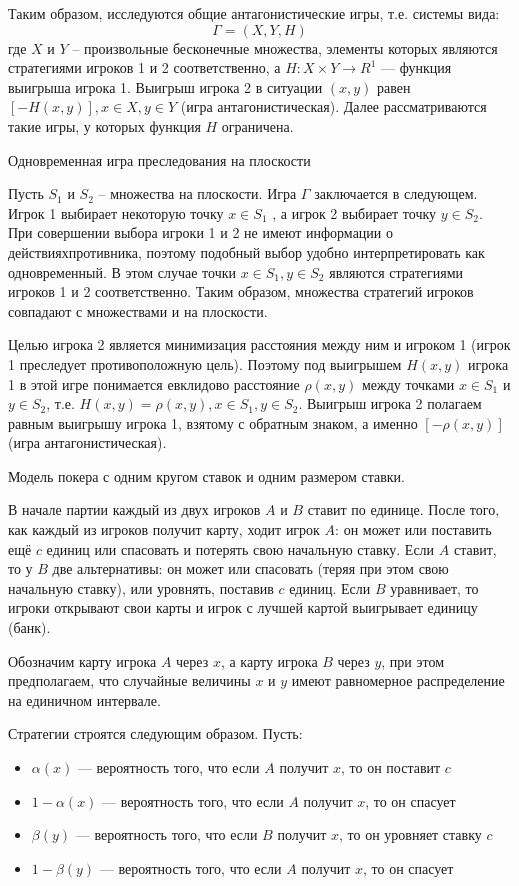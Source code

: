 \documentclass[12pt,a4paper]{article}
\begin{document}
Таким образом, исследуются общие антагонистические игры, т.е. системы
вида:
\[
  \Gamma = (X, Y, H)
\]
где $X$ и $Y$ – произвольные бесконечные множества, элементы которых
являются стратегиями игроков 1 и 2 соответственно,
а $H:X \times Y \rightarrow R^1$ --- функция выигрыша игрока 1.
Выигрыш игрока 2 в ситуации $(x, y)$ равен $[-H(x,y)], x \in X, y \in Y$ (игра антагонистическая).
Далее рассматриваются такие игры, у которых функция $H$ ограничена.

\vspace{.5cm}
Одновременная игра преследования на плоскости

Пусть $S_1$ и $S_2$ – множества на плоскости. Игра $\Gamma$ заключается в следующем.
Игрок 1 выбирает некоторую точку $x \in S_1$ , а игрок 2 выбирает точку $y \in S_2$.
При совершении выбора игроки 1 и 2 не имеют информации о действияхпротивника,
поэтому подобный выбор удобно интерпретировать как одновременный.
В этом случае точки $x \in S_1, y \in S_2$ являются стратегиями игроков
1 и 2 соответственно. Таким образом, множества стратегий игроков совпадают с
множествами и на плоскости.

Целью игрока 2 является минимизация расстояния между ним и игроком 1
(игрок 1 преследует противоположную цель). Поэтому под выигрышем $H(x,y)$
игрока 1 в этой игре понимается евклидово расстояние $\rho(x,y)$ между точками
$x \in S_1$ и $y \in S_2$, т.е. $H(x, y) = \rho(x, y), x \in S_1, y \in S_2$.
Выигрыш игрока 2 полагаем равным выигрышу игрока 1, взятому с обратным знаком,
а именно $[-\rho(x,y)]$ (игра антагонистическая).

\vspace{.5cm}
Модель покера с одним кругом ставок и одним размером ставки.

В начале партии каждый из двух игроков $A$ и $B$ ставит по единице.
После того, как каждый из игроков получит карту, ходит игрок $A$:
он может или поставить ещё $c$ единиц или спасовать и потерять свою начальную ставку.
Если $A$ ставит, то у $B$ две альтернативы: он может или спасовать (теряя при этом
свою начальную ставку), или уровнять, поставив $c$ единиц. Если $B$ уравнивает,
то игроки открывают свои карты и игрок с лучшей картой выигрывает единицу
(банк).

Обозначим карту игрока $A$ через $x$, а карту игрока $B$ через $y$,
при этом предполагаем, что случайные величины $x$ и $y$ имеют
равномерное распределение на единичном интервале.

Стратегии строятся следующим образом. Пусть:
\begin{itemize}
  \item $\alpha(x)$ --- вероятность того, что если $A$ получит $x$, то он поставит $c$
  \item $1 - \alpha(x)$ --- вероятность того, что если $A$ получит $x$, то он спасует
  \item $\beta(y)$ --- вероятность того, что если $B$ получит $x$, то он уровняет ставку $c$
  \item $1 - \beta(y)$ --- вероятность того, что если $A$ получит $x$, то он спасует
\end{itemize}
\end{document}
